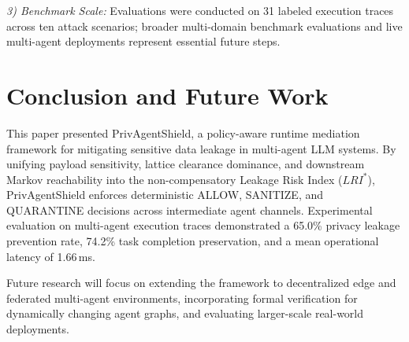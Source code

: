 \documentclass[conference]{IEEEtran}
\begin{document}
\textit{3) Benchmark Scale:} Evaluations were conducted on 31 labeled execution traces across ten attack scenarios; broader multi-domain benchmark evaluations and live multi-agent deployments represent essential future steps.

\section{Conclusion and Future Work}
This paper presented PrivAgentShield, a policy-aware runtime mediation framework for mitigating sensitive data leakage in multi-agent LLM systems. By unifying payload sensitivity, lattice clearance dominance, and downstream Markov reachability into the non-compensatory Leakage Risk Index ($LRI^*$), PrivAgentShield enforces deterministic ALLOW, SANITIZE, and QUARANTINE decisions across intermediate agent channels. Experimental evaluation on multi-agent execution traces demonstrated a 65.0\% privacy leakage prevention rate, 74.2\% task completion preservation, and a mean operational latency of 1.66\,ms.

Future research will focus on extending the framework to decentralized edge and federated multi-agent environments, incorporating formal verification for dynamically changing agent graphs, and evaluating larger-scale real-world deployments.
\end{document}
